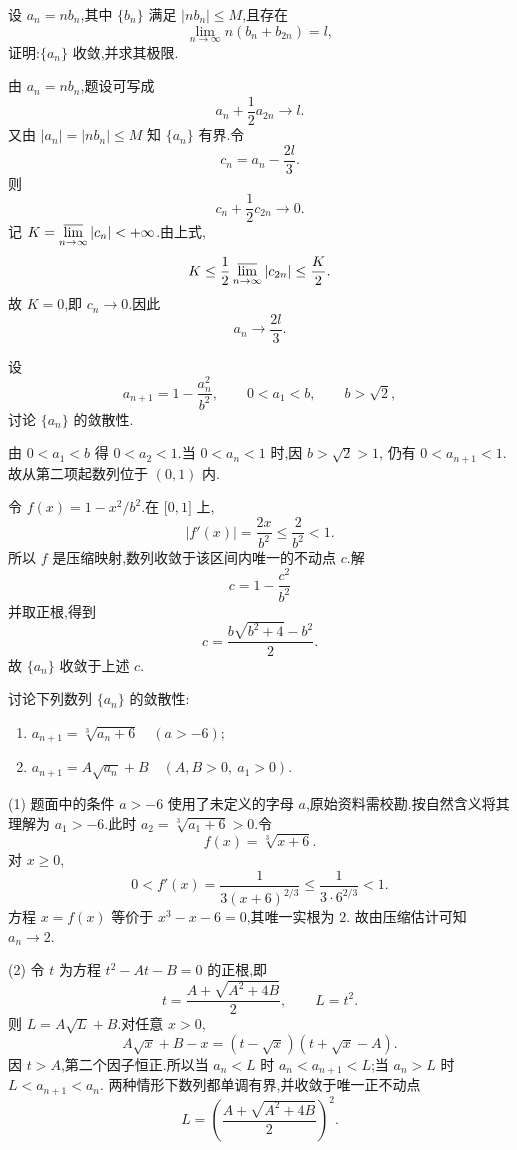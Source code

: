 \begin{example}
  设 $a_n=nb_n$,其中 $\{b_n\}$ 满足 $|nb_n|\leq M$,且存在
  \[
    \lim\limits_{n\to\infty}n(b_n+b_{2n})=l,
  \]
  证明:$\{a_n\}$ 收敛,并求其极限.
\end{example}
\exampleblank

\begin{solution}
  由 $a_n=nb_n$,题设可写成
  \[
    a_n+\dfrac{1}{2}a_{2n}\longrightarrow l.
  \]
  又由 $|a_n|=|nb_n|\leq M$ 知 $\{a_n\}$ 有界.令
  \[
    c_n=a_n-\dfrac{2l}{3}.
  \]
  则
  \[
    c_n+\dfrac{1}{2}c_{2n}\longrightarrow0.
  \]
  记 $K=\varlimsup\limits_{n\to\infty}|c_n|<+\infty$.由上式,
  \[
    K\leq\dfrac{1}{2}\varlimsup\limits_{n\to\infty}|c_{2n}|
    \leq\dfrac{K}{2}.
  \]
  故 $K=0$,即 $c_n\to0$.因此
  \[
    a_n\longrightarrow\dfrac{2l}{3}.
  \]
\end{solution}

\begin{example}
  设
  \[
    a_{n+1}=1-\dfrac{a_n^2}{b^2},
    \qquad 0<a_1<b,
    \qquad b>\sqrt2,
  \]
  讨论 $\{a_n\}$ 的敛散性.
\end{example}
\exampleblank

\begin{solution}
  由 $0<a_1<b$ 得 $0<a_2<1$.当 $0<a_n<1$ 时,因 $b>\sqrt2>1$,
  仍有 $0<a_{n+1}<1$.故从第二项起数列位于 $(0,1)$ 内.

  令 $f(x)=1-x^2/b^2$.在 $\lbrack0,1\rbrack$ 上,
  \[
    |f'(x)|=\dfrac{2x}{b^2}\leq\dfrac{2}{b^2}<1.
  \]
  所以 $f$ 是压缩映射,数列收敛于该区间内唯一的不动点 $c$.解
  \[
    c=1-\dfrac{c^2}{b^2}
  \]
  并取正根,得到
  \[
    c=\dfrac{b\sqrt{b^2+4}-b^2}{2}.
  \]
  故 $\{a_n\}$ 收敛于上述 $c$.
\end{solution}

\begin{example}
  讨论下列数列 $\{a_n\}$ 的敛散性:
  \begin{enumerate}
    \item $\displaystyle a_{n+1}=\sqrt[3]{a_n+6}\quad(a>-6)$;
    \item $\displaystyle a_{n+1}=A\sqrt{a_n}+B\quad(A,B>0,\ a_1>0)$.
  \end{enumerate}
\end{example}
\exampleblank

\begin{solution}
  (1) 题面中的条件 $a>-6$ 使用了未定义的字母 $a$,原始资料需校勘.按自然含义将其理解为
  $a_1>-6$.此时 $a_2=\sqrt[3]{a_1+6}>0$.令
  \[
    f(x)=\sqrt[3]{x+6}.
  \]
  对 $x\geq0$,
  \[
    0<f'(x)=\dfrac{1}{3(x+6)^{2/3}}
    \leq\dfrac{1}{3\cdot6^{2/3}}<1.
  \]
  方程 $x=f(x)$ 等价于 $x^3-x-6=0$,其唯一实根为 $2$.
  故由压缩估计可知 $a_n\to2$.

  (2) 令 $t$ 为方程 $t^2-At-B=0$ 的正根,即
  \[
    t=\dfrac{A+\sqrt{A^2+4B}}{2},
    \qquad L=t^2.
  \]
  则 $L=A\sqrt L+B$.对任意 $x>0$,
  \[
    A\sqrt x+B-x=(t-\sqrt x)(t+\sqrt x-A).
  \]
  因 $t>A$,第二个因子恒正.所以当 $a_n<L$ 时
  $a_n<a_{n+1}<L$;当 $a_n>L$ 时 $L<a_{n+1}<a_n$.
  两种情形下数列都单调有界,并收敛于唯一正不动点
  \[
    L=\left(\dfrac{A+\sqrt{A^2+4B}}{2}\right)^2.
  \]
\end{solution}

